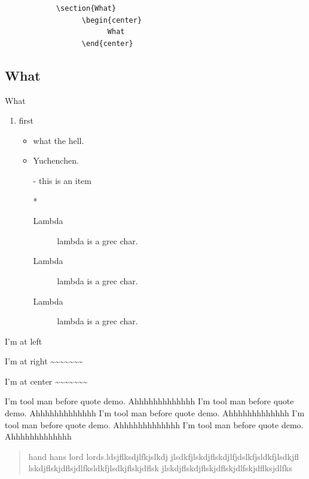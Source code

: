 \documentclass[11pt,oneside,a4paper]{article}
\begin{document}
      \begin{verbatim}
            \section{What}
                  \begin{center}
                        What
                  \end{center}
      \end{verbatim}
      \begin{verbatim*}
            \section{What}
                  \begin{center}
                        What
                  \end{center}
      \end{verbatim*}
      \begin{enumerate}
            \item first
            \begin{itemize}
                  \item what the hell.
                  \item Yuchenchen.
                  \item[-] this is an item
                  \item[*] 
                  \begin{description}
                        \item[Lambda] lambda is a grec char. 
                        \item[Lambda] lambda is a grec char. 
                        \item[Lambda] lambda is a grec char. 
                  \end{description}
            \end{itemize}
      \end{enumerate}
      
      \begin{flushleft}
           I'm at left~~~~~~~~~~~~~~~~ 
      \end{flushleft}
      \begin{flushright}
           I'm at right \~{}\~{}\~{}\~{}\~{}\~{}\~{}
      \end{flushright}
      \begin{center}
           I'm at center \~{}\~{}\~{}\~{}\~{}\~{}\~{}
      \end{center}
      I'm tool man before quote demo. Ahhhhhhhhhhhhh
      I'm tool man before quote demo. Ahhhhhhhhhhhhh
      I'm tool man before quote demo. Ahhhhhhhhhhhhh
      I'm tool man before quote demo. Ahhhhhhhhhhhhh
      I'm tool man before quote demo. Ahhhhhhhhhhhhh
      \begin{quotation}
            hand hans lord lords.ldsjflksdjlfkjslkdj
            jlsdkfjlskdjflskdjlfjdslkfjsldkfjlsdkjfl
            lskdjflskjdflsjdlfksldkfjlsdkjflskjdflsk
            jlskdjflskdjflskjdflskjdlfskjdflksjdlfks
      \end{quotation}
\end{document}
